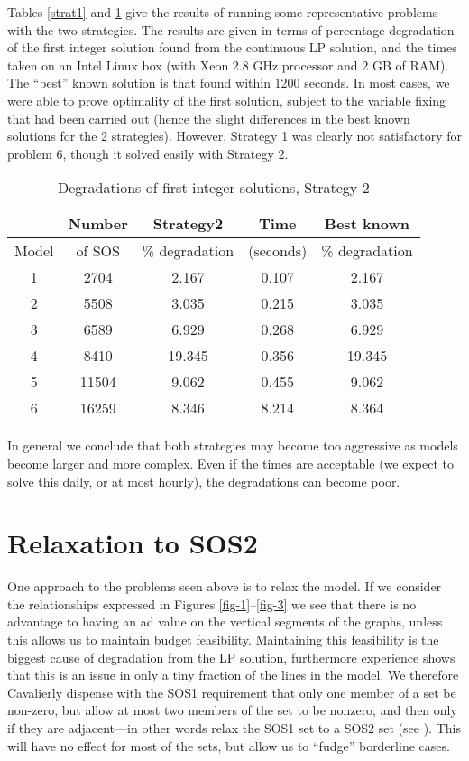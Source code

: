 \documentclass[finalversion,simpleeqnnos]{yrl}
\begin{document}
Tables \ref{strat1} and \ref{strat2} give the results of running some representative problems with the two strategies. The results are given in terms of percentage degradation of the first integer solution found from the continuous LP solution, and the times taken on an Intel Linux box (with Xeon 2.8 GHz processor and   2 GB of RAM). The ``best'' known solution is that found within 1200 seconds. In most cases, we were able to prove optimality of the first solution, subject to the variable fixing that had been carried out (hence the slight differences in the best known solutions for the 2 strategies). However, Strategy 1 was clearly not satisfactory for problem 6, though it solved easily with Strategy 2.

\begin{table}[htbp]
\begin{centering}
\begin{tabular}{|| c | c | c | c | c ||}
\hline
 & Number & Strategy2 & Time & Best known \\ \hline
Model & of SOS &\% degradation & (seconds) & \% degradation \\ \hline
1 & 2704 & 2.167 & 0.107 & 2.167 \\ \hline
2 & 5508 & 3.035 & 0.215 & 3.035 \\ \hline 
3 & 6589 & 6.929 & 0.268 & 6.929 \\ \hline 
4 & 8410 & 19.345 & 0.356 & 19.345 \\ \hline 
5 & 11504 & 9.062 & 0.455 & 9.062 \\ \hline 
6 & 16259 & 8.346 & 8.214 & 8.364 \\ \hline 
\end{tabular}
\caption{Degradations of first integer solutions, Strategy 2}
\label{strat2}
\end{centering}
\end{table}


In general we conclude that both strategies may become too aggressive as models become larger and more complex. Even if the times are acceptable (we expect to solve this daily, or at most hourly), the degradations can become poor.

\section{Relaxation to SOS2}

One approach to the problems seen above is to relax the model. If we consider the relationships expressed in Figures \ref{fig-1}--\ref{fig-3} we see that there is no advantage to having an ad value on the vertical segments of the graphs, unless this allows us to maintain budget feasibility. Maintaining this feasibility is the biggest cause of degradation from the LP solution, furthermore experience shows that this is an issue in only a tiny fraction of the lines in the model. We therefore Cavalierly dispense with the SOS1 requirement that only one member of a set be non-zero, but allow at most two members of the set to be nonzero, and then only if they are adjacent---in other words relax the SOS1 set to a SOS2 set (see \cite{F-T}). This will have no effect for most of the sets, but allow us to ``fudge'' borderline cases.
\end{document}
